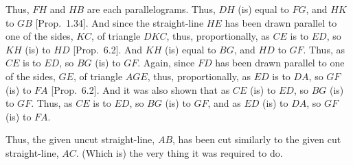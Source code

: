 \begin{Parallel}{}{}
{Thus, $FH$ and $HB$ are each parallelograms. Thus, $DH$ (is) equal to $FG$,
and $HK$ to $GB$ [Prop.~1.34]. 
And since the straight-line $HE$ has been drawn parallel to one of the
sides, $KC$, of triangle $DKC$, thus, proportionally, as $CE$ is to $ED$,  so $KH$
(is) to $HD$ [Prop.~6.2]. And $KH$ (is)
equal to $BG$, and $HD$ to $GF$. Thus, as $CE$ is to $ED$, so $BG$ (is) to $GF$. 
Again, since $FD$ has been drawn parallel to one of the sides, $GE$, of
triangle $AGE$, thus, proportionally, as $ED$ is to $DA$, so $GF$ (is) to $FA$
[Prop.~6.2]. And it was also shown
that as $CE$ (is) to $ED$, so $BG$ (is) to $GF$. Thus, as
$CE$ is to $ED$, so $BG$ (is) to $GF$, and as $ED$ (is) to $DA$, so $GF$ (is) to
$FA$.

Thus, the given uncut straight-line, $AB$, has been cut similarly
to the given cut straight-line, $AC$. (Which is) the very thing it was required to do.}
\end{Parallel}

